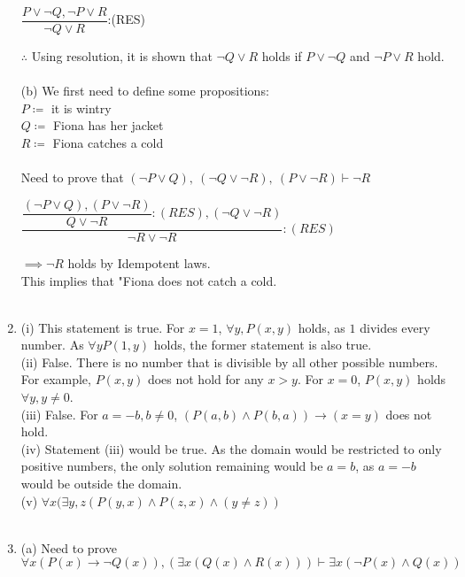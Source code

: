 \documentclass[a4paper]{article}
\begin{document}
\begin{enumerate}
\begin{center}
$
\dfrac{
P \lor \neg Q, \neg P \lor R
}{
\neg Q \lor R
}
$:(RES)
\end{center}
$\therefore$ Using resolution, it is shown that $\neg Q \lor R$ holds if $P \lor \neg Q$ and $\neg P \lor R$ hold.\\
\\ 
(b) We first need to define some propositions:\\
$P \coloneqq$ it is wintry\\
$Q \coloneqq$ Fiona has her jacket\\
$R \coloneqq$ Fiona catches a cold\\
\\
Need to prove that $(\neg P \lor Q),\ (\neg Q \lor \neg R),\ (P \lor \neg R) \vdash \neg R$
\begin{center}
$
\dfrac{
    \dfrac{
    (\neg P \lor Q), (P \lor \neg R)
    }{Q \lor \neg R}: (RES), (\neg Q \lor \neg R)
}{\neg R \lor \neg R}: (RES)
$
\end{center}
$\implies \neg R$ holds by Idempotent laws.\\
This implies that "Fiona does not catch a cold.\\
\\ 
\item (i) This statement is true. For $x = 1$, $\forall y, P(x, y)$ holds, as $1$ divides every number. As $\forall y P(1, y)$ holds, the former statement is also true.\\
(ii) False. There is no number that is divisible by all other possible numbers. For example, $P(x, y)$ does not hold for any $x > y$. For $x=0$, $P(x, y)$ holds $\forall y, y \neq 0$.\\
(iii) False. For $a = -b, b \neq 0$, $(P(a, b) \land P(b, a)) \rightarrow (x = y)$ does not hold.\\
(iv) Statement (iii) would be true. As the domain would be restricted to only positive numbers, the only solution remaining would be $a = b$, as $a = -b$ would be outside the domain.\\
(v) $\forall x (\exists y, z (P(y, x) \land P(z, x) \land (y \neq z))$\\ 
\\
\item (a) Need to prove $\forall x (P(x) \rightarrow \neg Q(x)), (\exists x (Q(x) \land R(x))) \vdash \exists x (\neg P(x) \land Q(x))$
\begin{mathpar}
\end{mathpar}


\end{enumerate}
\end{document}
